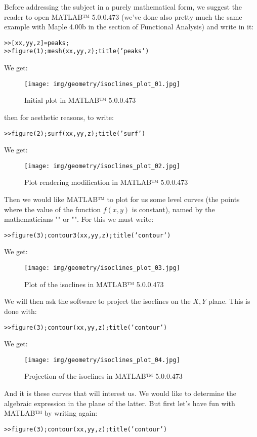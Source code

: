{	Before addressing the subject in a purely mathematical form, we suggest the reader to open MATLAB™ 5.0.0.473 (we've done also pretty much the same example with Maple 4.00b in the section of Functional Analysis) and write in it:
	
	\texttt{>>[xx,yy,z]=peaks;\\
	>>figure(1);mesh(xx,yy,z);title('peaks')}
	
	We get:
	\begin{figure}[H]
		\centering
		\texttt{[image: img/geometry/isoclines\_plot\_01.jpg]}
		\caption[]{Initial plot in MATLAB™ 5.0.0.473}
	\end{figure}
	then for aesthetic reasons, to write:
	
	\texttt{>>figure(2);surf(xx,yy,z);title('surf')}
	
	We get:
	\begin{figure}[H]
		\centering
		\texttt{[image: img/geometry/isoclines\_plot\_02.jpg]}
		\caption[]{Plot rendering modification in MATLAB™ 5.0.0.473}
	\end{figure}
	
	Then we would like MATLAB™  to plot for us some level curves (the points where the value of the function $f (x, y)$ is constant), named by the mathematicians "" or "". For this we must write:
	
	\texttt{>>figure(3);contour3(xx,yy,z);title('contour')}
	
	We get:
	\begin{figure}[H]
		\centering
		\texttt{[image: img/geometry/isoclines\_plot\_03.jpg]}
		\caption{Plot of the isoclines in MATLAB™ 5.0.0.473}
	\end{figure}
	We will then ask the software to project the isoclines on the $X, Y$ plane. This is done with:
	
	\texttt{>>figure(3);contour(xx,yy,z);title('contour')}
	
	We get:
	\begin{figure}[H]
		\centering
		\texttt{[image: img/geometry/isoclines\_plot\_04.jpg]}
		\caption{Projection of the isoclines in MATLAB™ 5.0.0.473}
	\end{figure}
	And it is these curves that will interest us. We would like to determine the algebraic expression in the plane of the latter. But first let's have fun with MATLAB™  by writing again:
	
	\texttt{>>figure(3);contour(xx,yy,z);title('contour')}
	
}
